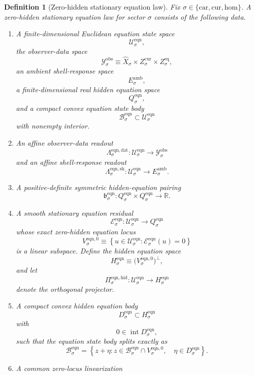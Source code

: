 \documentclass[11pt]{article}
\newcommand{\Car}{\mathrm{car}}
\newcommand{\Cur}{\mathrm{cur}}
\newcommand{\Hom}{\mathrm{hom}}
\newcommand{\VisibleAffine}[1]{\widehat X_{#1}}
\newcommand{\DataSpace}[1]{\mathcal Y_{#1}^{\mathrm{obs}}}
\newcommand{\AmbientTarget}[1]{E_{#1}^{\mathrm{amb}}}
\newcommand{\EqnSpace}[1]{\mathcal U_{#1}^{\mathrm{eqn}}}
\newcommand{\EqnBody}[1]{\mathcal B_{#1}^{\mathrm{eqn}}}
\newcommand{\EqnData}[1]{\Lambda_{#1}^{\mathrm{eqn,dat}}}
\newcommand{\EqnShell}[1]{\Lambda_{#1}^{\mathrm{eqn,sh}}}
\newcommand{\EqnTarget}[1]{Q_{#1}^{\mathrm{eqn}}}
\newcommand{\EqnPair}[1]{\mathfrak b_{#1}^{\mathrm{eqn}}}
\newcommand{\EqnResidual}[1]{\mathcal E_{#1}^{\mathrm{eqn}}}
\newcommand{\EqnZero}[1]{V_{#1}^{\mathrm{eqn},0}}
\newcommand{\EqnHidden}[1]{H_{#1}^{\mathrm{eqn}}}
\newcommand{\EqnHiddenBody}[1]{D_{#1}^{\mathrm{eqn}}}
\newcommand{\EqnProj}[1]{\Pi_{#1}^{\mathrm{eqn,hid}}}
\newtheorem{definition}{Definition}
\begin{document}
\begin{definition}[Zero-hidden stationary equation law]
\label{def:equation}
Fix \(\sigma\in\{\Car,\Cur,\Hom\}\). A \emph{zero-hidden stationary equation law} for sector \(\sigma\) consists of the following data.
\begin{enumerate}
    \item A finite-dimensional Euclidean equation state space
    \[
    \EqnSpace{\sigma},
    \]
    the observer-data space
    \[
    \DataSpace{\sigma}
    \equiv
    \VisibleAffine{\sigma}\times Z_{\sigma}^{\mathrm{cur}}\times Z_{\sigma}^{\mathrm{eq}},
    \]
    an ambient shell-response space
    \[
    \AmbientTarget{\sigma},
    \]
    a finite-dimensional real hidden equation space
    \[
    \EqnTarget{\sigma},
    \]
    and a compact convex equation state body
    \[
    \EqnBody{\sigma}\subset\EqnSpace{\sigma}
    \]
    with nonempty interior.
    \item An affine observer-data readout
    \[
    \EqnData{\sigma}:\EqnSpace{\sigma}\to\DataSpace{\sigma}
    \]
    and an affine shell-response readout
    \[
    \EqnShell{\sigma}:\EqnSpace{\sigma}\to\AmbientTarget{\sigma}.
    \]
    \item A positive-definite symmetric hidden-equation pairing
    \[
    \EqnPair{\sigma}:
    \EqnTarget{\sigma}\times\EqnTarget{\sigma}\to\mathbb R.
    \]
    \item A smooth stationary equation residual
    \[
    \EqnResidual{\sigma}:\EqnSpace{\sigma}\to\EqnTarget{\sigma}
    \]
    whose exact zero-hidden equation locus
    \[
    \EqnZero{\sigma}
    \equiv
    \left\{
    u\in\EqnSpace{\sigma}:
    \EqnResidual{\sigma}(u)=0
    \right\}
    \]
    is a linear subspace. Define the hidden equation space
    \[
    \EqnHidden{\sigma}
    \equiv
    \bigl(\EqnZero{\sigma}\bigr)^{\perp},
    \]
    and let
    \[
    \EqnProj{\sigma}:\EqnSpace{\sigma}\to\EqnHidden{\sigma}
    \]
    denote the orthogonal projector.
    \item A compact convex hidden equation body
    \[
    \EqnHiddenBody{\sigma}\subset\EqnHidden{\sigma}
    \]
    with
    \[
    0\in\operatorname{int}\EqnHiddenBody{\sigma},
    \]
    such that the equation state body splits exactly as
    \begin{equation}
    \EqnBody{\sigma}
    =
    \left\{
    z+\eta:
    z\in\EqnBody{\sigma}\cap\EqnZero{\sigma},
    \quad
    \eta\in\EqnHiddenBody{\sigma}
    \right\}.
    \label{eq:eqnsplitting}
    \end{equation}
    \item A common zero-locus linearization

\end{enumerate}
\end{definition}
\end{document}
